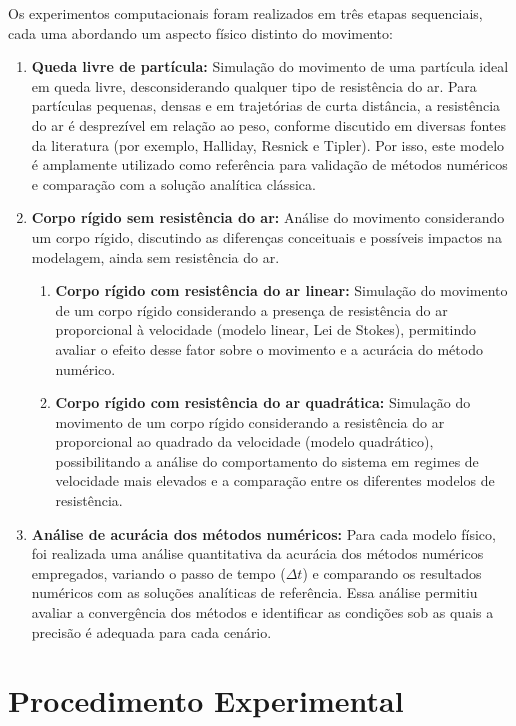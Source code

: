 Os experimentos computacionais foram realizados em três etapas sequenciais, cada uma abordando um aspecto físico distinto do movimento:
    \begin{enumerate}
        \item \textbf{Queda livre de partícula:} Simulação do movimento de uma partícula ideal em queda livre, desconsiderando qualquer tipo de resistência do ar. Para partículas pequenas, densas e em trajetórias de curta distância, a resistência do ar é desprezível em relação ao peso, conforme discutido em diversas fontes da literatura (por exemplo, Halliday, Resnick e Tipler)\cite{halliday2011,tipler2009}. Por isso, este modelo é amplamente utilizado como referência para validação de métodos numéricos e comparação com a solução analítica clássica.
        \item \textbf{Corpo rígido sem resistência do ar:} Análise do movimento considerando um corpo rígido, discutindo as diferenças conceituais e possíveis impactos na modelagem, ainda sem resistência do ar.
        \begin{enumerate}
        \item \textbf{Corpo rígido com resistência do ar linear:} Simulação do movimento de um corpo rígido considerando a presença de resistência do ar proporcional à velocidade (modelo linear, Lei de Stokes), permitindo avaliar o efeito desse fator sobre o movimento e a acurácia do método numérico.
        \item \textbf{Corpo rígido com resistência do ar quadrática:} Simulação do movimento de um corpo rígido considerando a resistência do ar proporcional ao quadrado da velocidade (modelo quadrático), possibilitando a análise do comportamento do sistema em regimes de velocidade mais elevados e a comparação entre os diferentes modelos de resistência.
        \end{enumerate}
        \item \textbf{Análise de acurácia dos métodos numéricos:} Para cada modelo físico, foi realizada uma análise quantitativa da acurácia dos métodos numéricos empregados, variando o passo de tempo ($\Delta t$) e comparando os resultados numéricos com as soluções analíticas de referência. Essa análise permitiu avaliar a convergência dos métodos e identificar as condições sob as quais a precisão é adequada para cada cenário.
    \end{enumerate}

\section{Procedimento Experimental}
\label{sec_procedimento_experimental}

